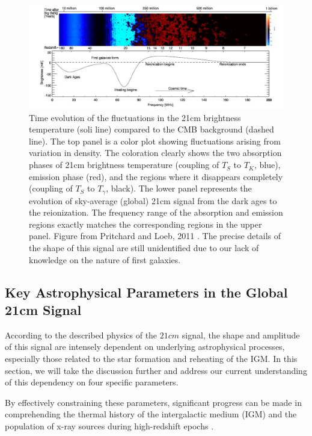 \documentclass[12pt, TexShade, letterpaper]{report}
\begin{document}
\begin{figure}[h!]

\centering
\includegraphics[scale =0.8]{global_signal_pritchard_loeb.jpg}
\caption[Time evolution of the fluctuations in the 21cm brightness temperature]{Time evolution of the fluctuations in the 21cm brightness temperature (soli line) compared to the CMB background (dashed line). The top panel is a color plot showing fluctuations arising from variation in density. The coloration clearly shows the two absorption phases of 21cm brightness temperature (coupling of $T_S$ to $T_K$, blue), emission phase (red), and the regions where it disappears completely (coupling of $T_S$ to $T_\gamma$, black). The lower panel represents the evolution of sky-average (global) 21cm signal from the dark ages to the reionization. The frequency range of the absorption and emission regions exactly matches the corresponding regions in the upper panel. Figure from Pritchard and Loeb, 2011 \cite{21century}. The precise details of the shape of this signal are still unidentified due to our lack of knowledge on the nature of first galaxies\cite{liu2013global}.}
\label{fig:global_signal_pritchard_loeb}
\end{figure}
\subsection{Key Astrophysical Parameters in the Global 21cm Signal}
According to the described physics of the $21cm$ signal, the shape and amplitude of this signal are intensely dependent on underlying astrophysical processes, especially those related to the star formation and reheating of the IGM. In this section, we will take the discussion further and address our current understanding of this dependency on four specific parameters.\par

By effectively constraining these parameters, significant progress can be made in comprehending the thermal history of the intergalactic medium (IGM) and the population of x-ray sources during high-redshift epochs \cite{21century}.\par
\end{document}
